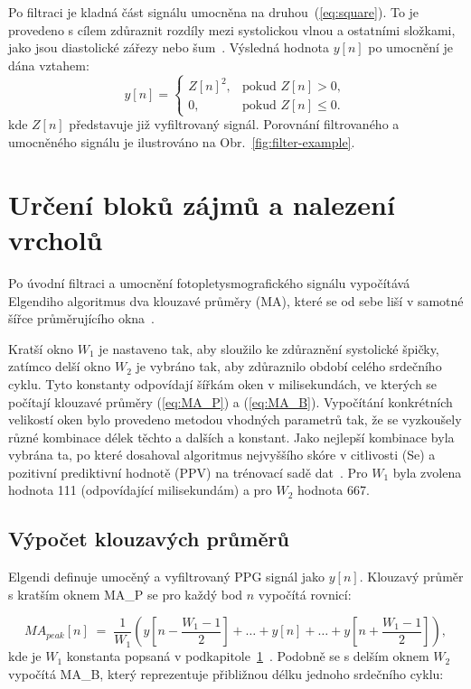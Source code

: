 Po filtraci je kladná část signálu umocněna na druhou~(\ref{eq:square}).
To je provedeno s cílem zdůraznit rozdíly mezi systolickou vlnou a ostatními složkami, jako jsou diastolické zářezy nebo šum~\cite{Elgendi2013}.
Výsledná hodnota $y[n]$ po umocnění je dána vztahem:
\begin{equation}
	\label{eq:square}
		y[n] =
		\begin{cases}
			Z[n]^2, & \text{pokud } Z[n] > 0,\\[1mm]
			0, & \text{pokud } Z[n] \le 0.
		\end{cases}
	\end{equation}
kde $Z[n]$ představuje již vyfiltrovaný signál.
Porovnání filtrovaného a umocněného signálu je ilustrováno na Obr.~\ref{fig:filter-example}.

\section{Určení bloků zájmů a nalezení vrcholů}
\label{sec:thr_peaks}
% 
Po úvodní filtraci a umocnění fotopletysmografického signálu vypočítává Elgendiho algoritmus dva klouzavé průměry (\acs{MA}), které se od sebe liší v samotné šířce průměrujícího okna~\cite{Elgendi2013}.

Kratší okno \(W_1\) je nastaveno tak, aby sloužilo ke zdůraznění systolické špičky, zatímco delší okno \(W_2\) je vybráno tak, aby zdůraznilo období celého srdečního cyklu.
Tyto konstanty odpovídají šířkám oken v milisekundách, ve kterých se počítají klouzavé průměry (\ref{eq:MA_P}) a (\ref{eq:MA_B}).
Vypočítání konkrétních velikostí oken bylo provedeno metodou  vhodných parametrů tak, že se vyzkoušely různé kombinace délek těchto a dalších a konstant.
Jako nejlepší kombinace byla vybrána ta, po které dosahoval algoritmus nejvyššího skóre v citlivosti (\acs{Se}) a pozitivní prediktivní hodnotě (\acs{PPV}) na trénovací sadě dat~\cite{Elgendi2013}.
Pro \(W_1\) byla zvolena hodnota 111 (odpovídající milisekundám) a pro \(W_2\) hodnota 667.

\subsection*{Výpočet klouzavých průměrů} %
\label{sec:MA}
% 
Elgendi definuje umocěný a vyfiltrovaný \acs{PPG} signál jako \(y[n]\).
Klouzavý průměr s kratším oknem \acs{MA_P} se pro každý bod \(n\) vypočítá rovnicí:

\begin{equation}
	MA_{peak}[n] \;=\;
	\frac{1}{W_1}
	(y[n - \frac{W_1-1}{2}] + \ldots + y[n] + \ldots + y[n + \frac{W_1-1}{2}]),
	\label{eq:MA_P}
\end{equation}
kde je \(W_1\) konstanta popsaná v podkapitole~\ref{sec:thr_peaks}~\cite{Elgendi2013}.
Podobně se s delším oknem \(W_2\) vypočítá \acs{MA_B}, který reprezentuje přibližnou délku jednoho srdečního cyklu:

